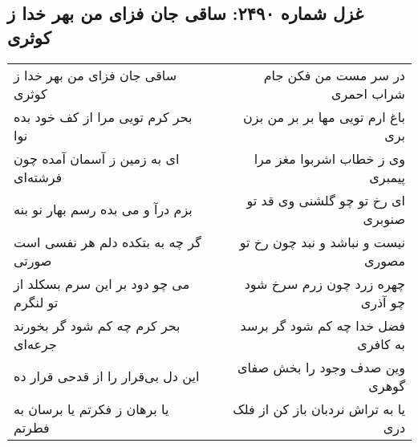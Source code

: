 \begin{center}
\section*{غزل شماره ۲۴۹۰: ساقی جان فزای من بهر خدا ز کوثری}
\label{sec:2490}
\begin{longtable}{l p{0.5cm} r}
ساقی جان فزای من بهر خدا ز کوثری
&&
در سر مست من فکن جام شراب احمری
\\
بحر کرم تویی مرا از کف خود بده نوا
&&
باغ ارم تویی مها بر بر من بزن بری
\\
ای به زمین ز آسمان آمده چون فرشته‌ای
&&
وی ز خطاب اشربوا مغز مرا پیمبری
\\
بزم درآ و می بده رسم بهار نو بنه
&&
ای رخ تو چو گلشنی وی قد تو صنوبری
\\
گر چه به بتکده دلم هر نفسی است صورتی
&&
نیست و نباشد و نبد چون رخ تو مصوری
\\
می چو دود بر این سرم بسکلد از تو لنگرم
&&
چهره زرد چون زرم سرخ شود چو آذری
\\
بحر کرم چه کم شود گر بخورند جرعه‌ای
&&
فضل خدا چه کم شود گر برسد به کافری
\\
این دل بی‌قرار را از قدحی قرار ده
&&
وین صدف وجود را بخش صفای گوهری
\\
یا برهان ز فکرتم یا برسان به فطرتم
&&
یا به تراش نردبان باز کن از فلک دری
\\
\end{longtable}
\end{center}
